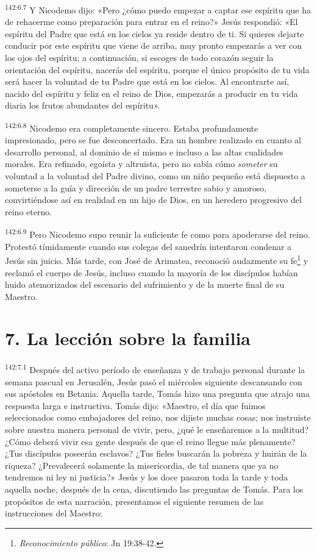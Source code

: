 \par 
\textsuperscript{142:6.7} Y Nicodemo dijo: «Pero ¿cómo puedo empezar a captar ese espíritu que ha de rehacerme como preparación para entrar en el reino?» Jesús respondió: «El espíritu del Padre que está en los cielos ya reside dentro de ti. Si quieres dejarte conducir por este espíritu que viene de arriba, muy pronto empezarás a ver con los ojos del espíritu; a continuación, si escoges de todo corazón seguir la orientación del espíritu, nacerás del espíritu, porque el único propósito de tu vida será hacer la voluntad de tu Padre que está en los cielos. Al encontrarte así, nacido del espíritu y feliz en el reino de Dios, empezarás a producir en tu vida diaria los frutos abundantes del espíritu».

\par 
\textsuperscript{142:6.8} Nicodemo era completamente sincero. Estaba profundamente impresionado, pero se fue desconcertado. Era un hombre realizado en cuanto al desarrollo personal, al dominio de sí mismo e incluso a las altas cualidades morales. Era refinado, egoísta y altruista, pero no sabía cómo \textit{someter} su voluntad a la voluntad del Padre divino, como un niño pequeño está dispuesto a someterse a la guía y dirección de un padre terrestre sabio y amoroso, convirtiéndose así en realidad en un hijo de Dios, en un heredero progresivo del reino eterno.

\par 
\textsuperscript{142:6.9} Pero Nicodemo supo reunir la suficiente fe como para apoderarse del reino. Protestó tímidamente cuando sus colegas del sanedrín intentaron condenar a Jesús sin juicio. Más tarde, con José de Arimatea, reconoció audazmente su fe\footnote{\textit{Reconocimiento público}: Jn 19:38-42.} y reclamó el cuerpo de Jesús, incluso cuando la mayoría de los discípulos habían huido atemorizados del escenario del sufrimiento y de la muerte final de su Maestro.

\section*{7. La lección sobre la familia}
\par 
\textsuperscript{142:7.1} Después del activo período de enseñanza y de trabajo personal durante la semana pascual en Jerusalén, Jesús pasó el miércoles siguiente descansando con sus apóstoles en Betania. Aquella tarde, Tomás hizo una pregunta que atrajo una respuesta larga e instructiva. Tomás dijo: «Maestro, el día que fuimos seleccionados como embajadores del reino, nos dijiste muchas cosas; nos instruiste sobre nuestra manera personal de vivir, pero, ¿qué le enseñaremos a la multitud? ¿Cómo deberá vivir esa gente después de que el reino llegue más plenamente? ¿Tus discípulos poseerán esclavos? ¿Tus fieles buscarán la pobreza y huirán de la riqueza? ¿Prevalecerá solamente la misericordia, de tal manera que ya no tendremos ni ley ni justicia?» Jesús y los doce pasaron toda la tarde y toda aquella noche, después de la cena, discutiendo las preguntas de Tomás. Para los propósitos de esta narración, presentamos el siguiente resumen de las instrucciones del Maestro:

